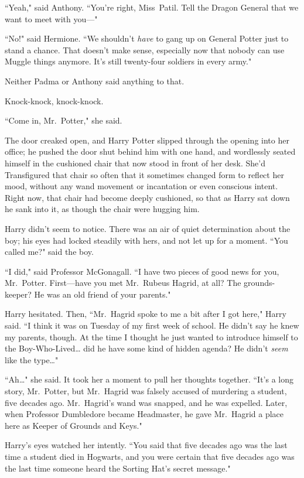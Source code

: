 ``Yeah," said Anthony. ``You're right, Miss~Patil. Tell the Dragon General that we want to meet with you---"

``No!" said Hermione. ``We shouldn't \emph{have} to gang up on General Potter just to stand a chance. That doesn't make sense, especially now that nobody can use Muggle things anymore. It's still twenty-four soldiers in every army."

Neither Padma or Anthony said anything to that.

\later

Knock-knock, knock-knock.

``Come in, Mr.~Potter," she said.

The door creaked open, and Harry Potter slipped through the opening into her office; he pushed the door shut behind him with one hand, and wordlessly seated himself in the cushioned chair that now stood in front of her desk. She'd Transfigured that chair so often that it sometimes changed form to reflect her mood, without any wand movement or incantation or even conscious intent. Right now, that chair had become deeply cushioned, so that as Harry sat down he sank into it, as though the chair were hugging him.

Harry didn't seem to notice. There was an air of quiet determination about the boy; his eyes had locked steadily with hers, and not let up for a moment. ``You called me?" said the boy.

``I did," said Professor McGonagall. ``I have two pieces of good news for you, Mr.~Potter. First---have you met Mr.~Rubeus Hagrid, at all? The grounds-keeper? He was an old friend of your parents."

Harry hesitated. Then, ``Mr.~Hagrid spoke to me a bit after I got here," Harry said. ``I think it was on Tuesday of my first week of school. He didn't say he knew my parents, though. At the time I thought he just wanted to introduce himself to the Boy-Who-Lived{\ldots} did he have some kind of hidden agenda? He didn't \emph{seem} like the type{\ldots}"

``Ah{\ldots}" she said. It took her a moment to pull her thoughts together. ``It's a long story, Mr.~Potter, but Mr.~Hagrid was falsely accused of murdering a student, five decades ago. Mr.~Hagrid's wand was snapped, and he was expelled. Later, when Professor Dumbledore became Headmaster, he gave Mr.~Hagrid a place here as Keeper of Grounds and Keys."

Harry's eyes watched her intently. ``You said that five decades ago was the last time a student died in Hogwarts, and you were certain that five decades ago was the last time someone heard the Sorting Hat's secret message."

